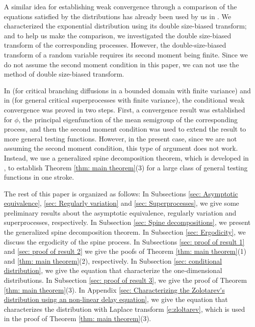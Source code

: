 \documentclass[12pt,a4paper]{amsart}
\theoremstyle{definition}
\numberwithin{equation}{section}
\begin{document}
A similar idea for establishing weak convergence through a comparison of the equations satisfied by the distributions has already been used by us in \cite{RenSongSun2017A-2-spine, RenSongSun2017Spine}.
We characterized the exponential distribution using its double size-biased transform; and to help us make the comparison, we investigated the double size-biased transform of the corresponding processes.
However, the double-size-biased transform of a random variable requires its second moment being finite.
Since we do not assume the second moment condition in this paper, we can not use the method of double size-biased transform.
		
In \cite{Powell2015An-invariance} (for critical branching diffusions in a bounded domain with finite variance) and in \cite{RenSongSun2017Spine, RenSongZhang2015Limit} (for general critical superprocesses with finite variance), the conditional weak convergence was proved in two steps.
First, a convergence result was established for $\phi$, the principal eigenfunction of the mean semigroup of the corresponding process, and then the second moment condition was used to extend the result to more general testing functions.
However, in the present case, since we are not assuming the second moment condition, this type of argument does not work.
Instead, we use a generalized spine decomposition theorem, which is developed in \cite{RenSongSun2017Spine}, to establish Theorem \ref{thm: main theorem}(3) for a large class of general testing functions in one stroke.

The rest of this paper is organized as follows:
In Subsections \ref{sec: Asymptotic equivalence}, \ref{sec: Regularly variation} and \ref{sec: Superprocesses}, we give some preliminary results about the asymptotic equivalence, 
regularly variation and superprocesses, respectively.
In Subsection \ref{sec: Spine decompositions}, we present the generalized spine decomposition theorem.
In Subsection \ref{sec: Ergodicity}, we discuss the ergodicity of the spine process.
In Subsections \ref{sec: proof of result 1} and \ref{sec: proof of result 2} we give the poofs of Theorem \ref{thm: main theorem}(1) and \ref{thm: main theorem}(2), respectively.
In Subsection \ref{sec: conditional distribution}, we give the equation that characterize the one-dimensional distributions.
In Subsection \ref{sec: proof of result 3}, we give the proof of Theorem \ref{thm: main theorem}(3).
In Appendix \ref{sec: Characterizing the Zolotarev's distribution using an non-linear delay equation}, we give the equation that characterizes the distribution with Laplace transform \eqref{e:zloltarev}, which is used in the proof of Theorem \ref{thm: main theorem}(3).
\end{document}
